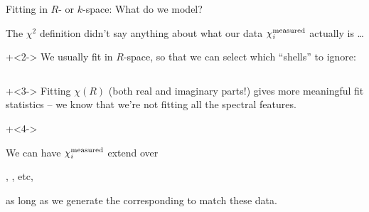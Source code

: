 \begin{slide}{Fitting in $R$- or $k$-space:  What do we model?}

  The $\chi^2$ definition didn't say anything about what our data
  $\chi_i^{\rm measured}$ actually is \ldots

  \onslide+<2->
  \vmm  We usually fit in $R$-space, so that  we can select which
  ``shells'' to ignore:

  \vmm \vmm

  \begin{columns}
    \begin{column}{53mm}    \end{column}
    \begin{column}{53mm}    \end{column}
  \end{columns}

  \vmm \onslide+<3-> Fitting $\chi(R)$ (both real and imaginary parts!) gives more
  meaningful fit statistics -- we know that we're not fitting all the
  spectral features.

  \vmm \onslide+<4->

  {}    We can have $\chi_i^{\rm measured}$  extend over

  \begin{center}{}, {},  etc, \end{center}

  as long as we generate the corresponding {} to
  match these data.

\vfill
\end{slide}

